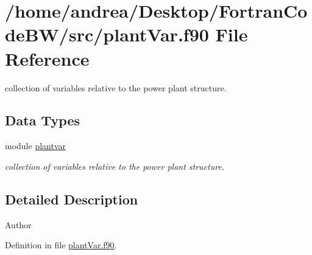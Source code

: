 \hypertarget{plant_var_8f90}{\section{/home/andrea/\-Desktop/\-Fortran\-Code\-B\-W/src/plant\-Var.f90 File Reference}
\label{plant_var_8f90}
}


collection of variables relative to the power plant structure.  


\subsection*{Data Types}
\begin{DoxyCompactItemize}
\item 
module \hyperlink{classplantvar}{plantvar}
\begin{DoxyCompactList}\small\item\em collection of variables relative to the power plant structure. \end{DoxyCompactList}\end{DoxyCompactItemize}


\subsection{Detailed Description}
\begin{DoxyAuthor}{Author}

\end{DoxyAuthor}


Definition in file \hyperlink{plant_var_8f90_source}{plant\-Var.\-f90}.

